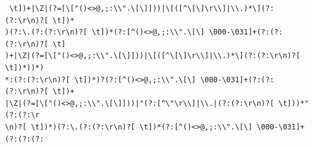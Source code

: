 \documentclass{beamer}
\begin{document}
\begin{frame}[fragile]
\begin{verbatim}
 \t])+|\Z|(?=[\["()<>@,;:\\".\[\]]))|\[([^\[\]\r\\]|\\.)*\](?:(?:\r\n)?[ \t])*
)(?:\.(?:(?:\r\n)?[ \t])*(?:[^()<>@,;:\\".\[\] \000-\031]+(?:(?:(?:\r\n)?[ \t]
)+|\Z|(?=[\["()<>@,;:\\".\[\]]))|\[([^\[\]\r\\]|\\.)*\](?:(?:\r\n)?[ \t])*))*)
*:(?:(?:\r\n)?[ \t])*)?(?:[^()<>@,;:\\".\[\] \000-\031]+(?:(?:(?:\r\n)?[ \t])+
|\Z|(?=[\["()<>@,;:\\".\[\]]))|"(?:[^\"\r\\]|\\.|(?:(?:\r\n)?[ \t]))*"(?:(?:\r
\n)?[ \t])*)(?:\.(?:(?:\r\n)?[ \t])*(?:[^()<>@,;:\\".\[\] \000-\031]+(?:(?:(?:
\end{verbatim}
 \endgroup
\end{frame}
\end{document}
